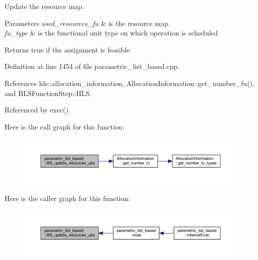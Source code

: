 Update the resource map. 


\begin{DoxyParams}{Parameters}
{\em used\+\_\+resources\+\_\+fu} & is the resource map. \\
\hline
{\em fu\+\_\+type} & is the functional unit type on which operation is scheduled \\
\hline
\end{DoxyParams}
\begin{DoxyReturn}{Returns}
true if the assignment is feasible 
\end{DoxyReturn}


Definition at line 1454 of file parametric\+\_\+list\+\_\+based.\+cpp.



References hls\+::allocation\+\_\+information, Allocation\+Information\+::get\+\_\+number\+\_\+fu(), and H\+L\+S\+Function\+Step\+::\+H\+LS.



Referenced by exec().

Here is the call graph for this function\+:
\nopagebreak
\begin{figure}[H]
\begin{center}
\leavevmode
\includegraphics[width=350pt]{d7/d47/classparametric__list__based_a3295dddee18a9c4091ad9bec2b23cc9f_cgraph}
\end{center}
\end{figure}
Here is the caller graph for this function\+:
\nopagebreak
\begin{figure}[H]
\begin{center}
\leavevmode
\includegraphics[width=350pt]{d7/d47/classparametric__list__based_a3295dddee18a9c4091ad9bec2b23cc9f_icgraph}
\end{center}
\end{figure}
\mbox{\label{classparametric__list__based_a9fc96b3511360dc67e2cff71077a8d80}} 
